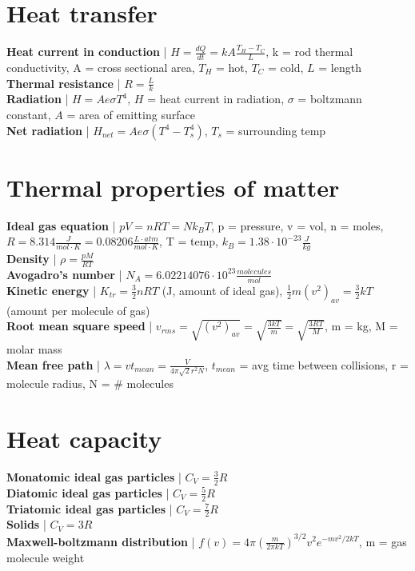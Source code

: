 \documentclass{article}
\begin{document}
\section{Heat transfer}
\vspace{-2mm}
\textbf{Heat current in conduction} | $H = \frac{dQ}{dt} = kA\frac{T_H - T_C}{L}$, k = rod thermal conductivity, A = cross sectional area, $T_H$ = hot, $T_C$ = cold, $L$ = length \\
\textbf{Thermal resistance} | $R = \frac{L}{k}$ \\
\textbf{Radiation} | $H = Ae\sigma T^4$, $H$ = heat current in radiation, $\sigma$ = boltzmann constant, $A$ = area of emitting surface \\
\textbf{Net radiation} | $H_{net} = Ae\sigma(T^4 - T_s^4)$, $T_s$ = surrounding temp \\
\vspace{-5mm}
\section{Thermal properties of matter}
\vspace{-2mm}
\textbf{Ideal gas equation} | $pV = nRT = Nk_BT$, p = pressure, v = vol, n = moles, $R = 8.314 \frac{J}{mol \cdot K} = 0.08206 \frac{L \cdot atm}{mol \cdot K}$, T = temp, $k_B = 1.38 \cdot 10^{-23} \frac{J}{kg}$ \\
\textbf{Density} | $\rho = \frac{pM}{RT}$ \\
\textbf{Avogadro's number} | $N_A = 6.02214076 \cdot 10^{23} \frac{molecules}{mol}$ \\
\textbf{Kinetic energy} | $K_{tr} = \frac{3}{2}nRT$ (J, amount of ideal gas), $\frac{1}{2}m(v^2)_{av} = \frac{3}{2}kT$ (amount per molecule of gas) \\
\textbf{Root mean square speed} | $v_{rms} = \sqrt{(v^2)_{av}} = \sqrt{\frac{3kT}{m}} = \sqrt{\frac{3RT}{M}}$, m = kg, M = molar mass \\
\textbf{Mean free path} | $\lambda = vt_{mean} = \frac{V}{4\pi\sqrt{2}r^2N}$, $t_{mean}$ = avg time between collisions, r = molecule radius, N = \# molecules
\vspace{-5mm}
\section{Heat capacity}
\vspace{-2mm}
\textbf{Monatomic ideal gas particles} | $C_V = \frac{3}{2}R$ \\
\textbf{Diatomic ideal gas particles} | $C_V = \frac{5}{2}R$ \\
\textbf{Triatomic ideal gas particles} | $C_V = \frac{7}{2}R$ \\
\textbf{Solids} | $C_V = 3R$ \\
\textbf{Maxwell-boltzmann distribution} | $f(v) = 4\pi\left(\frac{m}{2\pi kT}\right)^{3/2}v^2e^{-mv^2/2kT}$, m = gas molecule weight
\pagebreak
\end{document}
